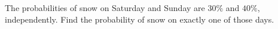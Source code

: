 The probabilities of snow on Saturday and Sunday are $30\%$ and $40\%$, independently. Find the probability of snow on exactly one of those days.
